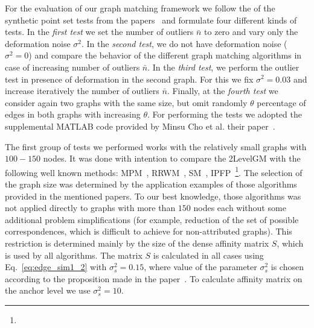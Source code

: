 For the evaluation of our graph matching framework we follow the  of the synthetic point set tests from the papers~\cite{Cho2014_Haystack,FastPFP} and formulate four different kinds of tests. In the \emph{first test} we set the number of outliers $\bar{n}$ to zero and vary only the deformation noise $\sigma^2$. In the \emph{second test}, we do not have deformation noise ($\sigma^2=0$) and compare the behavior of the different graph matching algorithms in case of increasing number of outliers $\bar{n}$. In the \emph{third test}, we perform the outlier test in presence of deformation in the second graph. For this we fix $\sigma^2= 0.03$ and increase iteratively the number of outliers $\bar{n}$. Finally, at the \emph{fourth test} we consider again two graphs with the same size, but omit randomly $\theta$ percentage of edges in both graphs with increasing $\theta$. 
For performing the tests we adopted the supplemental MATLAB code provided by Minsu Cho et al.  their paper~\cite{Cho2014_Haystack,code_MPM}. 

The first group of tests we performed works with the relatively small graphs with $100-150$ nodes. It was done with intention to compare the 2LevelGM with the following well known methods: MPM~\cite{Cho2014_Haystack}, RRWM~\cite{Cho2010_RRWM}, SM~\cite{Leordeanu2005_SM}, IPFP~\cite{Leordeanu2009_IPFP}\footnote{}. The selection of the graph size was determined by the application examples of those algorithms provided in the mentioned papers. To our best knowledge, those algorithms was not applied directly to graphs with more than $150$ nodes each without some additional problem simplifications (for example, reduction of the set of possible correspondences, which is difficult to achieve for non-attributed graphs). This restriction is determined mainly by the size of the dense affinity matrix $S$, which is used by all algorithms. The matrix $S$ is calculated in all cases using Eq.~\eqref{eq:edge_sim1_2} with $\sigma_s^2=0.15$, where value of the parameter $\sigma_s^2$ is chosen according to the proposition made in the paper~\cite{Cho2010_RRWM}. To calculate affinity matrix on the anchor level we use $\sigma_s^2=10$. 

